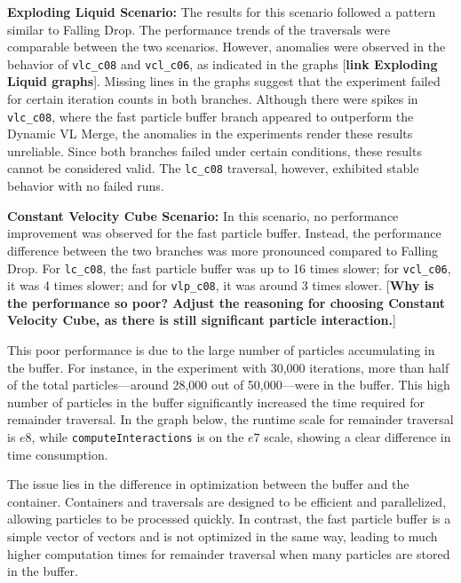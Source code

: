 \textbf{Exploding Liquid Scenario:}
The results for this scenario followed a pattern similar to Falling Drop. The performance trends of the traversals were comparable between the two scenarios. However, anomalies were observed in the behavior of \texttt{vlc\_c08} and \texttt{vcl\_c06}, as indicated in the graphs [\textbf{link Exploding Liquid graphs}]. Missing lines in the graphs suggest that the experiment failed for certain iteration counts in both branches. Although there were spikes in \texttt{vlc\_c08}, where the fast particle buffer branch appeared to outperform the Dynamic VL Merge, the anomalies in the experiments render these results unreliable. Since both branches failed under certain conditions, these results cannot be considered valid. The \texttt{lc\_c08} traversal, however, exhibited stable behavior with no failed runs.

\textbf{Constant Velocity Cube Scenario:}
In this scenario, no performance improvement was observed for the fast particle buffer. Instead, the performance difference between the two branches was more pronounced compared to Falling Drop. For \texttt{lc\_c08}, the fast particle buffer was up to 16 times slower; for \texttt{vcl\_c06}, it was 4 times slower; and for \texttt{vlp\_c08}, it was around 3 times slower. [\textbf{Why is the performance so poor? Adjust the reasoning for choosing Constant Velocity Cube, as there is still significant particle interaction.}]

This poor performance is due to the large number of particles accumulating in the buffer. For instance, in the experiment with 30,000 iterations, more than half of the total particles—around 28,000 out of 50,000—were in the buffer. This high number of particles in the buffer significantly increased the time required for remainder traversal. In the graph below, the runtime scale for remainder traversal is $e8$, while \texttt{computeInteractions} is on the $e7$ scale, showing a clear difference in time consumption.

The issue lies in the difference in optimization between the buffer and the container. Containers and traversals are designed to be efficient and parallelized, allowing particles to be processed quickly. In contrast, the fast particle buffer is a simple vector of vectors and is not optimized in the same way, leading to much higher computation times for remainder traversal when many particles are stored in the buffer.

